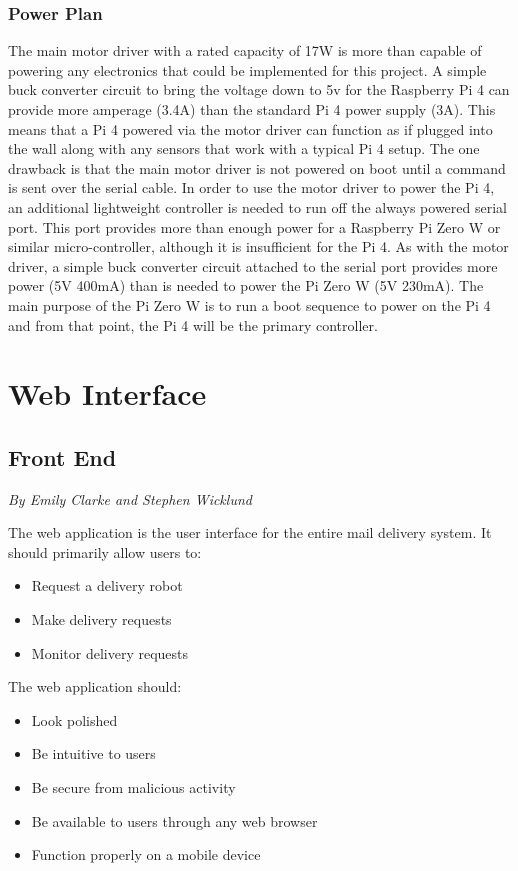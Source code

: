 \documentclass[12pt]{report}
\newcommand{\sectionAuthor}[1]{{\small\vspace{-1em}\textit{#1}}\bigskip\par}
\begin{document}
\subsubsection{Power Plan}
The main motor driver with a rated capacity of 17W is more than capable of powering any electronics that could be implemented for this project. A simple buck converter circuit to bring the voltage down to 5v for the Raspberry Pi 4 can provide more amperage (3.4A) than the standard Pi 4 power supply (3A). This means that a Pi 4 powered via the motor driver can function as if plugged into the wall along with any sensors that work with a typical Pi 4 setup. The one drawback is that the main motor driver is not powered on boot until a command is sent over the serial cable. In order to use the motor driver to power the Pi 4, an additional lightweight controller is needed to run off the always powered serial port. This port provides more than enough power for a Raspberry Pi Zero W or similar micro-controller, although it is insufficient for the Pi 4. As with the motor driver, a simple buck converter circuit attached to the serial port provides more power (5V 400mA) than is needed to power the Pi Zero W (5V 230mA). The main purpose of the Pi Zero W is to run a boot sequence to power on the Pi 4 and from that point, the Pi 4 will be the primary controller.

\section{Web Interface}
\subsection{Front End}
\sectionAuthor{By Emily Clarke and Stephen Wicklund}
\label{FrontEndDesign}
The web application is the user interface for the entire mail delivery system. It should primarily allow users to:
\begin{itemize}
\itemsep0em 
\item Request a delivery robot
\item Make delivery requests
\item Monitor delivery requests
\end{itemize}

The web application should:
\begin{itemize}
\itemsep0em 
\item Look polished
\item Be intuitive to users
\item Be secure from malicious activity
\item Be available to users through any web browser
\item Function properly on a mobile device
\end{itemize}
\end{document}
